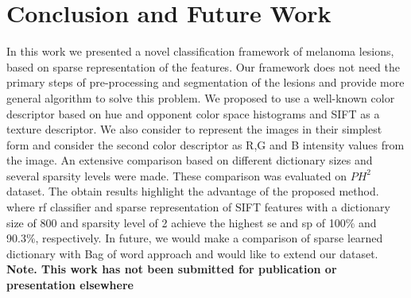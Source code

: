 \section{Conclusion and Future Work}
\label{sec:con}
In this work we presented a novel classification framework of melanoma lesions, based on sparse representation of the features. 
Our framework does not need the primary steps of pre-processing and segmentation of the lesions and provide more general algorithm to solve this problem. 
We proposed to use a well-known color descriptor based on hue and opponent color space histograms and SIFT as a texture descriptor. We also consider to represent the images in their simplest form and consider the second color descriptor as R,G and B intensity values from the image.
An extensive comparison based on different dictionary sizes and several sparsity levels were made. 
These comparison was evaluated on $PH^{2}$ dataset. 
The obtain results highlight the advantage of the proposed method. 
where \ac{rf} classifier and sparse representation of SIFT features with a dictionary size of 800 and sparsity level of 2 achieve the highest \ac{se} and \ac{sp} of 100\% and 90.3\%, respectively.
In future, we would make a comparison of sparse learned dictionary with Bag of word approach and would like to extend our dataset. \\


\textbf{Note. This work has not been submitted for publication or presentation elsewhere}

